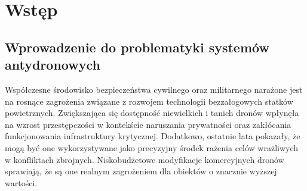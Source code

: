 \documentclass[a4paper,twoside,12pt]{book}
\newcounter{stronyPozaNumeracja}
\begin{document}
\tableofcontents

\setcounter{stronyPozaNumeracja}{\value{page}}
\mainmatter
\pagestyle{empty}

\cleardoublepage

\pagestyle{NumeryStronNazwyRozdzialow}


\chapter{Wstęp}



\section{Wprowadzenie do problematyki systemów antydronowych}

Współczesne środowisko bezpieczeństwa cywilnego oraz militarnego narażone jest na rosnące zagrożenia związane z rozwojem technologii bezzałogowych statków powietrznych. Zwiększająca się dostępność niewielkich i tanich dronów wpłynęła na wzrost przestępczości w kontekście naruszania prywatności oraz zakłócania funkcjonowania infrastruktury krytycznej. Dodatkowo, ostatnie lata pokazały, że mogą być one wykorzystywane jako precyzyjny środek rażenia celów wrażliwych w konfliktach zbrojnych. Niskobudżetowe modyfikacje komercyjnych dronów sprawiają, że są one realnym zagrożeniem dla obiektów o znacznie wyższej wartości.
\end{document}

